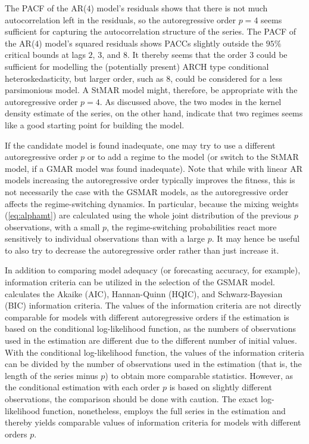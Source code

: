 \documentclass[nojss]{jss} %
\begin{document}
The PACF of the AR($4$) model's residuals shows that there is not much autocorrelation left in the residuals, so the autoregressive order $p=4$ seems sufficient for capturing the autocorrelation structure of the series. The PACF of the AR($4$) model's squared residuals shows PACCs slightly outside the $95\%$ critical bounds at lags $2$, $3$, and $8$. It thereby seems that the order $3$ could be sufficient for modelling the (potentially present) ARCH type conditional heteroskedasticity, but larger order, such as $8$, could be considered for a less parsimonious model. %
A StMAR model might, therefore, be appropriate with the autoregressive order $p=4$. As discussed above, the two modes in the kernel density estimate of the series, on the other hand, indicate that two regimes seems like a good starting point for building the model.

If the candidate model is found inadequate, one may try to use a different autoregressive order $p$ or to add a regime to the model (or switch to the StMAR model, if a GMAR model was found inadequate). Note that while with linear AR models increasing the autoregressive order typically improves the fitness, this is not necessarily the case with the GSMAR models, as the autoregressive order affects the regime-switching dynamics. In particular, because the mixing weights (\ref{eq:alphamt}) are calculated using the whole joint distribution of the previous $p$ observations, with a small $p$, the regime-switching probabilities react more sensitively to individual observations than with a large $p$. It may hence be useful to also try to decrease the autoregressive order rather than just increase it.

In addition to comparing model adequacy (or forecasting accuracy, for example), information criteria can be utilized in the selection of the GSMAR model.  calculates the Akaike (AIC), Hannan-Quinn (HQIC), and Schwarz-Bayesian (BIC) information criteria. The values of the information criteria are not directly comparable for models with different autoregressive orders if the estimation is based on the conditional log-likelihood function, as the numbers of observations used in the estimation are different due to the different number of initial values. With the conditional log-likelihood function, the values of the information criteria can be divided by the number of observations used in the estimation (that is, the length of the series minus $p$) to obtain more comparable statistics. However, as the conditional estimation with each order $p$ is based on slightly different observations, the comparison should be done with caution. The exact log-likelihood function, nonetheless, employs the full series in the estimation and thereby yields comparable values of information criteria for models with different orders $p$.
\end{document}
